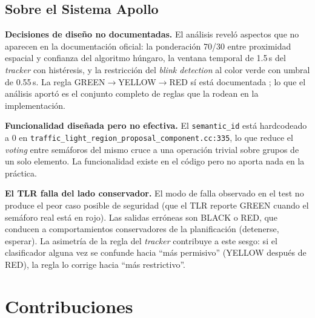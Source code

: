 \subsection{Sobre el Sistema Apollo}

\textbf{Decisiones de diseño no documentadas.} El análisis reveló aspectos que no aparecen en la documentación oficial: la ponderación 70/30 entre proximidad espacial y confianza del algoritmo húngaro, la ventana temporal de 1.5\,s del \textit{tracker} con histéresis, y la restricción del \textit{blink detection} al color verde con umbral de 0.55\,s. La regla GREEN$\to$YELLOW$\to$RED sí está documentada \cite{apollo_tlr_docs}; lo que el análisis aportó es el conjunto completo de reglas que la rodean en la implementación.

\textbf{Funcionalidad diseñada pero no efectiva.} El \texttt{semantic\_id} está hardcodeado a 0 en \texttt{traffic\_light\_region\_proposal\_component.cc:335}, lo que reduce el \textit{voting} entre semáforos del mismo cruce a una operación trivial sobre grupos de un solo elemento. La funcionalidad existe en el código pero no aporta nada en la práctica.

\textbf{El TLR falla del lado conservador.} El modo de falla observado en el test no produce el peor caso posible de seguridad (que el TLR reporte GREEN cuando el semáforo real está en rojo). Las salidas erróneas son BLACK o RED, que conducen a comportamientos conservadores de la planificación (detenerse, esperar). La asimetría de la regla del \textit{tracker} contribuye a este sesgo: si el clasificador alguna vez se confunde hacia ``más permisivo'' (YELLOW después de RED), la regla lo corrige hacia ``más restrictivo''.

\section{Contribuciones}

